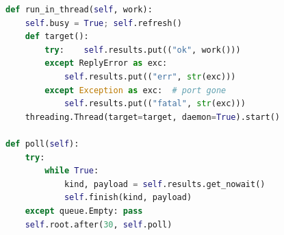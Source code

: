 \begin{figure}[t]
\begin{lstlisting}[float=false,language=Python, caption={GUI worker thread and queue polling (\texttt{app.py}, trimmed).}, label=lst:gui]
def run_in_thread(self, work):
    self.busy = True; self.refresh()
    def target():
        try:    self.results.put(("ok", work()))
        except ReplyError as exc:
            self.results.put(("err", str(exc)))
        except Exception as exc:  # port gone
            self.results.put(("fatal", str(exc)))
    threading.Thread(target=target, daemon=True).start()

def poll(self):
    try:
        while True:
            kind, payload = self.results.get_nowait()
            self.finish(kind, payload)
    except queue.Empty: pass
    self.root.after(30, self.poll)
\end{lstlisting}
\end{figure}
